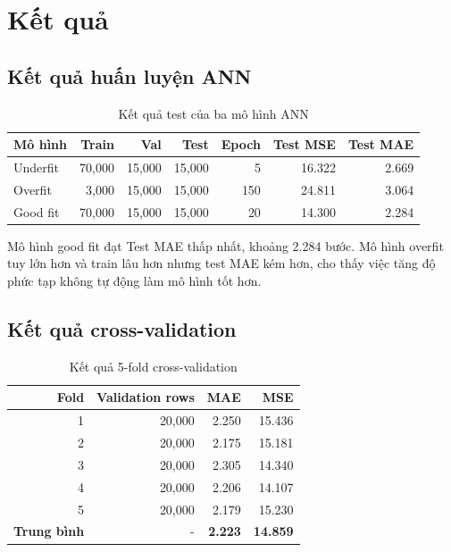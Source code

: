 \documentclass[12pt,a4paper]{article}
\begin{document}
\section{Kết quả}

\subsection{Kết quả huấn luyện ANN}

\begin{table}[H]
\centering
\caption{Kết quả test của ba mô hình ANN}
\begin{tabular}{lrrrrrr}
\toprule
\textbf{Mô hình} & \textbf{Train} & \textbf{Val} & \textbf{Test} & \textbf{Epoch} & \textbf{Test MSE} & \textbf{Test MAE} \\
\midrule
Underfit & 70,000 & 15,000 & 15,000 & 5 & 16.322 & 2.669 \\
Overfit & 3,000 & 15,000 & 15,000 & 150 & 24.811 & 3.064 \\
Good fit & 70,000 & 15,000 & 15,000 & 20 & 14.300 & 2.284 \\
\bottomrule
\end{tabular}
\end{table}

Mô hình good fit đạt Test MAE thấp nhất, khoảng 2.284 bước. Mô hình overfit tuy lớn hơn và train lâu hơn nhưng test MAE kém hơn, cho thấy việc tăng độ phức tạp không tự động làm mô hình tốt hơn.


\subsection{Kết quả cross-validation}

\begin{table}[H]
\centering
\caption{Kết quả 5-fold cross-validation}
\begin{tabular}{rrrr}
\toprule
\textbf{Fold} & \textbf{Validation rows} & \textbf{MAE} & \textbf{MSE} \\
\midrule
1 & 20,000 & 2.250 & 15.436 \\
2 & 20,000 & 2.175 & 15.181 \\
3 & 20,000 & 2.305 & 14.340 \\
4 & 20,000 & 2.206 & 14.107 \\
5 & 20,000 & 2.179 & 15.230 \\
\midrule
\textbf{Trung bình} & - & \textbf{2.223} & \textbf{14.859} \\
\bottomrule
\end{tabular}
\end{table}
\end{document}
